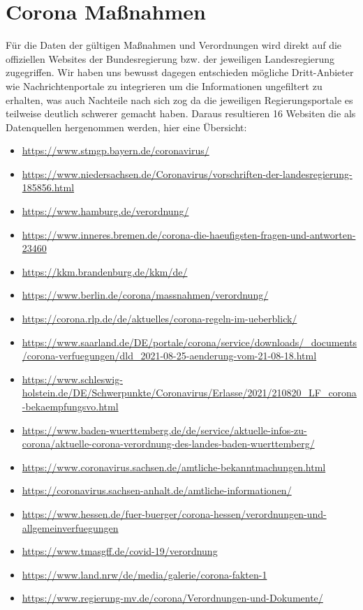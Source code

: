 \documentclass[12pt,oneside,a4paper,parskip]{scrbook}
\begin{document}
\section{Corona Maßnahmen}
Für die Daten der gültigen Maßnahmen und Verordnungen wird direkt auf die offiziellen Websites der Bundesregierung bzw. der jeweiligen Landesregierung zugegriffen. Wir haben uns bewusst dagegen entschieden mögliche Dritt-Anbieter wie Nachrichtenportale zu integrieren um die Informationen ungefiltert zu erhalten, was auch Nachteile nach sich zog da die jeweiligen Regierungsportale es teilweise deutlich schwerer gemacht haben. Daraus resultieren 16 Websiten die als Datenquellen hergenommen werden, hier eine Übersicht:

\begin{itemize}
\itemsep-1em
\item \url{https://www.stmgp.bayern.de/coronavirus/}
\item \url{https://www.niedersachsen.de/Coronavirus/vorschriften-der-landesregierung-185856.html}
\item \url{https://www.hamburg.de/verordnung/}
\item \url{https://www.inneres.bremen.de/corona-die-haeufigsten-fragen-und-antworten-23460}
\item \url{https://kkm.brandenburg.de/kkm/de/}
\item \url{https://www.berlin.de/corona/massnahmen/verordnung/}
\item \url{https://corona.rlp.de/de/aktuelles/corona-regeln-im-ueberblick/}
\item \url{https://www.saarland.de/DE/portale/corona/service/downloads/_documents/corona-verfuegungen/dld_2021-08-25-aenderung-vom-21-08-18.html}
\item \url{https://www.schleswig-holstein.de/DE/Schwerpunkte/Coronavirus/Erlasse/2021/210820_LF_corona-bekaempfungsvo.html}
\item \url{https://www.baden-wuerttemberg.de/de/service/aktuelle-infos-zu-corona/aktuelle-corona-verordnung-des-landes-baden-wuerttemberg/}
\item \url{https://www.coronavirus.sachsen.de/amtliche-bekanntmachungen.html}
\item \url{https://coronavirus.sachsen-anhalt.de/amtliche-informationen/}
\item \url{https://www.hessen.de/fuer-buerger/corona-hessen/verordnungen-und-allgemeinverfuegungen}
\item \url{https://www.tmasgff.de/covid-19/verordnung}
\item \url{https://www.land.nrw/de/media/galerie/corona-fakten-1}
\item \url{https://www.regierung-mv.de/corona/Verordnungen-und-Dokumente/}
\end{itemize}
\end{document}
